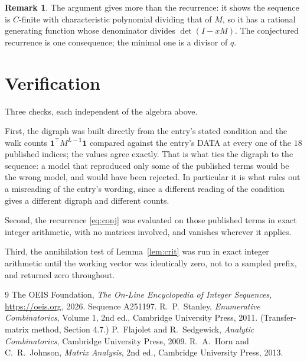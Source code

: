 \documentclass[11pt,a4paper]{article}
\theoremstyle{plain}
\theoremstyle{definition}
\newtheorem{remark}[theorem]{Remark}
\begin{document}
\begin{remark}
The argument gives more than the recurrence: it shows the sequence is $C$-finite with
characteristic polynomial dividing that of $M$, so it has a rational generating function
whose denominator divides $\det(I-xM)$. The conjectured recurrence is one consequence; the
minimal one is a divisor of $q$.
\end{remark}

\section{Verification}

Three checks, each independent of the algebra above.

First, the digraph was built directly from the entry's stated condition and the walk counts
$\mathbf{1}^{\!\top}M^{L-1}\mathbf{1}$ compared against the entry's DATA at
every one of the $18$ published indices; the values agree exactly. That is what ties
the digraph to the sequence: a model that reproduced only some of the published terms would
be the wrong model, and would have been rejected. In particular it is what rules out a
misreading of the entry's wording, since a different reading of the condition gives a
different digraph and different counts.

Second, the recurrence \eqref{eq:conj} was evaluated on those published terms in exact
integer arithmetic, with no matrices involved, and vanishes wherever it applies.

Third, the annihilation test of Lemma~\ref{lem:crit} was run in exact integer arithmetic
until the working vector was identically zero, not to a sampled prefix, and returned zero
throughout.

\begin{thebibliography}{9}
 The OEIS Foundation, \emph{The On-Line Encyclopedia of Integer
Sequences}, \url{https://oeis.org}, 2026. Sequence A251197.
 R.~P.~Stanley, \emph{Enumerative Combinatorics}, Volume 1, 2nd ed.,
Cambridge University Press, 2011. (Transfer-matrix method, Section 4.7.)
 P.~Flajolet and R.~Sedgewick, \emph{Analytic Combinatorics}, Cambridge
University Press, 2009.
 R.~A.~Horn and C.~R.~Johnson, \emph{Matrix Analysis}, 2nd ed., Cambridge
University Press, 2013.
\end{thebibliography}
\end{document}
